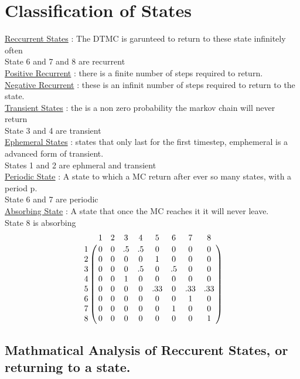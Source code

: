 \documentclass{article}
\begin{document}
    \section{Classification of States}
    \underline{Reccurrent States} : The DTMC is garunteed to return to these state infinitely often
    \\State 6 and 7 and 8 are recurrent
    \\\underline{Positive Recurrent} : there is a finite number of steps required to return. 
    \\\underline{Negative Recurrent} : these is an infinit number of steps required to return to the state. 
    \\\underline{Transient States} : the is a non zero probability the markov chain will never return
    \\State 3 and 4 are transient
    \\\underline{Ephemeral States} : states that only last for the first timestep, emphemeral is a advanced form of transient. 
    \\States 1 and 2 are ephmeral and transient
    \\\underline{Periodic State} : A state to which a MC return after ever so many states, with a period p.
    \\State 6 and 7 are periodic 
    \\\underline{Absorbing State} : A state that once the MC reaches it it will never leave. 
    \\State 8 is absorbing
    \[\bordermatrix{
        & 1 & 2 & 3 & 4 & 5 & 6 & 7 & 8 \cr
      1 & 0 & 0 & .5& .5&0  &0  &0  &0  \cr
      2 & 0 & 0 & 0 & 0 & 1 & 0 & 0 & 0 \cr
      3 & 0 & 0 & 0 & .5& 0 & .5& 0 &0  \cr
      4 & 0 & 0 & 1& 0 & 0 & 0 & 0 & 0 \cr
      5 &0  &0  &0  &0  &.33&0  &.33&.33\cr
      6 & 0 & 0 & 0 & 0 & 0 & 0 & 1 & 0 \cr
      7 &  0&  0&  0& 0 & 0 &  1&0  & 0 \cr
      8 & 0 & 0 & 0 & 0 & 0 & 0 & 0 & 1\cr    
       }\]
   
   	\subsection{Mathmatical Analysis of Reccurent States, or returning to a state. }
\end{document}
